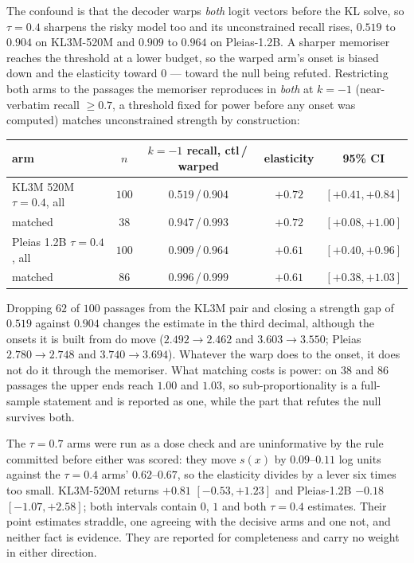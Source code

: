The confound is that the decoder warps \emph{both} logit vectors before the KL solve, so $\tau = 0.4$
sharpens the risky model too and its unconstrained recall rises, $0.519$ to $0.904$ on KL3M-520M and
$0.909$ to $0.964$ on Pleias-1.2B. A sharper memoriser reaches the threshold at a lower budget, so
the warped arm's onset is biased down and the elasticity toward $0$ --- toward the null being
refuted. Restricting both arms to the passages the memoriser reproduces in \emph{both} at $k=-1$
(near-verbatim recall $\ge 0.7$, a threshold fixed for power before any onset was computed) matches
unconstrained strength by construction:

\begin{center}\footnotesize
\setlength{\tabcolsep}{4pt}
\begin{tabular}{@{}lcccc@{}}
\toprule
arm & $n$ & $k{=}{-}1$ recall, ctl\,/\,warped & elasticity & 95\% CI \\
\midrule
KL3M 520M $\tau=0.4$, all & $100$ & $0.519$\,/\,$0.904$ & $+0.72$ & $[+0.41, +0.84]$ \\
\quad matched                      & $38$  & $0.947$\,/\,$0.993$ & $+0.72$ & $[+0.08, +1.00]$ \\
\addlinespace
Pleias 1.2B $\tau=0.4$, all & $100$ & $0.909$\,/\,$0.964$ & $+0.61$ & $[+0.40, +0.96]$ \\
\quad matched                        & $86$  & $0.996$\,/\,$0.999$ & $+0.61$ & $[+0.38, +1.03]$ \\
\bottomrule
\end{tabular}
\end{center}

Dropping $62$ of $100$ passages from the KL3M pair and closing a strength gap of $0.519$ against
$0.904$ changes the estimate in the third decimal, although the onsets it is built from do move
($2.492 \to 2.462$ and $3.603 \to 3.550$; Pleias $2.780 \to 2.748$ and $3.740 \to 3.694$). Whatever
the warp does to the onset, it does not do it through the memoriser. What matching costs is power:
on $38$ and $86$ passages the upper ends reach $1.00$ and $1.03$, so sub-proportionality is a
full-sample statement and is reported as one, while the part that refutes the null survives both.

The $\tau = 0.7$ arms were run as a dose check and are uninformative by the rule committed before
either was scored: they move $s(x)$ by $0.09$--$0.11$ log units against the $\tau = 0.4$ arms'
$0.62$--$0.67$, so the elasticity divides by a lever six times too small. KL3M-520M returns $+0.81$
$[-0.53, +1.23]$ and Pleias-1.2B $-0.18$ $[-1.07, +2.58]$; both intervals contain $0$, $1$ and both
$\tau = 0.4$ estimates. Their point estimates straddle, one agreeing with the decisive arms and one
not, and neither fact is evidence. They are reported for completeness and carry no weight in either
direction.

